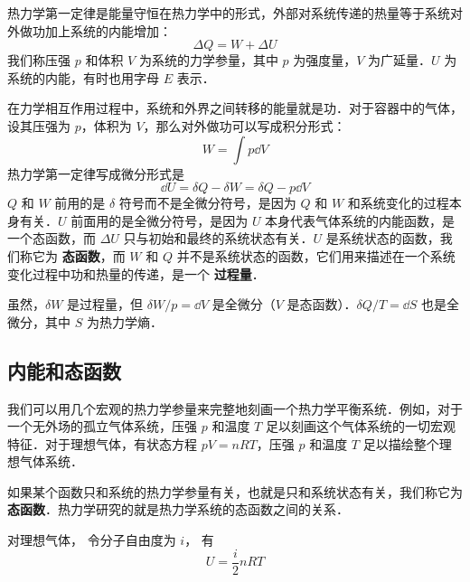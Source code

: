
\begin{issues}
\issueDraft
\end{issues}


热力学第一定律是能量守恒在热力学中的形式，外部对系统传递的热量等于系统对外做功加上系统的内能增加：
\begin{equation}\label{Th1Law_eq1}
\Delta Q = W + \Delta U
\end{equation}
我们称压强 $p$ 和体积 $V$ 为系统的力学参量，其中 $p$ 为强度量，$V$ 为广延量．$U$ 为系统的内能，有时也用字母 $E$ 表示．


在力学相互作用过程中，系统和外界之间转移的能量就是功．对于容器中的气体，设其压强为 $p$，体积为 $V$，那么对外做功可以写成积分形式：
\begin{equation}
W = \int p \dd{V}
\end{equation}
热力学第一定律写成微分形式是
\begin{equation}
\dd U=\delta Q-\delta W=\delta Q-p\dd V
\end{equation}
$Q$ 和 $W$ 前用的是 $\delta$ 符号而不是全微分符号，是因为 $Q$ 和 $W$ 和系统变化的过程本身有关．$U$ 前面用的是全微分符号，是因为 $U$ 本身代表气体系统的内能函数，是一个态函数，而 $\Delta U$ 只与初始和最终的系统状态有关．$U$ 是系统状态的函数，我们称它为 \textbf{态函数}，而 $W$ 和 $Q$ 并不是系统状态的函数，它们用来描述在一个系统变化过程中功和热量的传递，是一个 \textbf{过程量}．

虽然，$\delta W$ 是过程量，但 $\delta W/p=\dd V$ 是全微分（$V$ 是态函数）．$\delta Q/T=\dd S$ 也是全微分，其中 $S$ 为热力学熵．

\subsection{内能和态函数}
我们可以用几个宏观的热力学参量来完整地刻画一个热力学平衡系统．例如，对于一个无外场的孤立气体系统，压强 $p$ 和温度 $T$ 足以刻画这个气体系统的一切宏观特征．对于理想气体，有状态方程 $pV=nRT$，压强 $p$ 和温度 $T$ 足以描绘整个理想气体系统．

如果某个函数只和系统的热力学参量有关，也就是只和系统状态有关，我们称它为\textbf{态函数}．热力学研究的就是热力学系统的态函数之间的关系．

对理想气体， 令分子自由度为 $i$， 有
\begin{equation}
U = \frac{i}{2}n RT
\end{equation}

